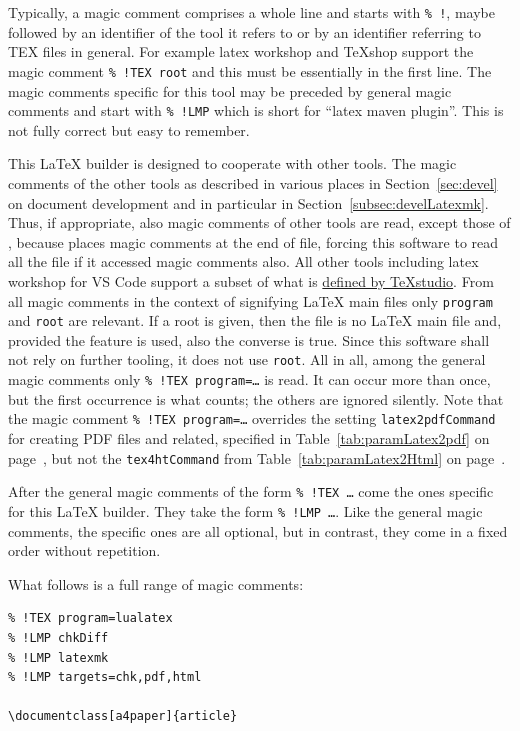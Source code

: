 Typically, a magic comment comprises a whole line and starts with \texttt{\%~!}, 
maybe followed by an identifier of the tool it refers to 
or by an identifier referring to TEX files in general. 
For example latex workshop and \TeX{}shop support the magic comment \texttt{\%~!TEX root} 
and this must be essentially in the first line. 
The magic comments specific for this tool may be preceded by general magic comments 
and start with \texttt{\%~!LMP} which is short for ``latex maven plugin''. 
This is not fully correct but easy to remember. 

This \LaTeX{} builder is designed to cooperate with other tools. 
The magic comments of the other tools 
as described in various places in Section~\ref{sec:devel} 
on document development and in particular in Section~\ref{subsec:develLatexmk}. 
Thus, if appropriate, also magic comments of other tools are read, 
except those of \auctex, because \auctex{} places magic comments at the end of file, 
forcing this software to read all the file if it accessed \auctex{} magic comments also. 
All other tools including latex workshop for VS Code 
support a subset of what is 
\href{http://transit.iut2.upmf-grenoble.fr/doc/texstudio/html/usermanual_en.html#TEXCOM}%
{defined by \TeX{}studio}. 
From all magic comments in the context of signifying \LaTeX{} main files 
only \texttt{program} and \texttt{root} are relevant. 
If a root is given, then the file is no \LaTeX{} main file 
and, provided the feature is used, also the converse is true. 
Since this software shall not rely on further tooling, 
it does not use \texttt{root}. 
All in all, among the general magic comments only 
\texttt{\%~!TEX program=\dots} is read. 
It can occur more than once, but the first occurrence is what counts; 
the others are ignored silently. %
Note that the magic comment \texttt{\%~!TEX program=\dots} overrides 
the setting \texttt{latex2pdfCommand} for creating PDF files and related, 
specified in Table~\ref{tab:paramLatex2pdf} on page~\pageref{tab:paramLatex2pdf}, 
but not the \texttt{tex4htCommand} from Table~\ref{tab:paramLatex2Html} 
on page~\pageref{tab:paramLatex2Html}. 

After the general magic comments of the form \texttt{\%~!TEX \dots} 
come the ones specific for this \LaTeX{} builder. 
They take the form \texttt{\%~!LMP \dots}. 
Like the general magic comments, the specific ones are all optional, 
but in contrast, they come in a fixed order without repetition. 

What follows is a full range of magic comments: 
%
\begin{Verbatim}
% !TEX program=lualatex
% !LMP chkDiff
% !LMP latexmk
% !LMP targets=chk,pdf,html

\documentclass[a4paper]{article}
\end{Verbatim}


